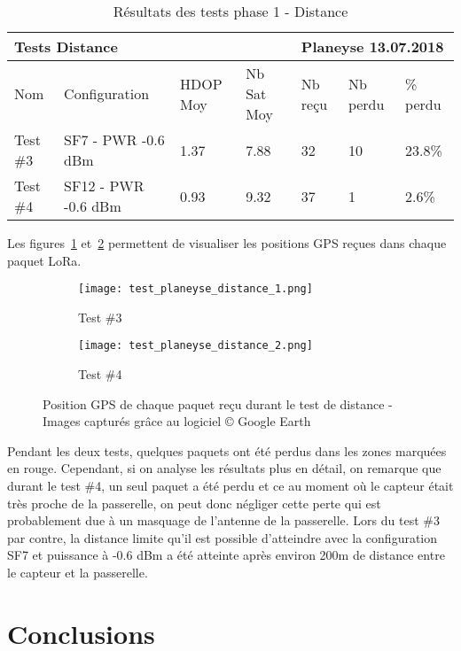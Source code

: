 \begin{table}[htb]
\caption[Résultats des tests phase 1 - Distance]{Résultats des tests phase 1 - Distance}
\label{tab:resultat_test_1_distance}
\centering
\begin{tabular}{lllllll}
\toprule
\multicolumn{4}{l}{ Tests Distance } & \multicolumn{3}{l}{ Planeyse 13.07.2018 } \\
\toprule
Nom & Configuration & HDOP Moy & Nb Sat Moy & Nb reçu & Nb perdu & \% perdu \\
\midrule
Test \#3 & SF7 - PWR -0.6 dBm & 1.37 & 7.88 & 32 & 10 & 23.8\% \\
Test \#4 & SF12 - PWR -0.6 dBm & 0.93 & 9.32 & 37 & 1 & 2.6\%  \\
\bottomrule 
\end{tabular}
\end{table}

Les figures~\ref{fig:test_distance_1} et~\ref{fig:test_distance_2} permettent de visualiser les positions GPS reçues dans chaque paquet LoRa.

\begin{figure}[htb]
\centering
\begin{subfigure}{.5\textwidth}
  \centering
  \texttt{[image: test\_planeyse\_distance\_1.png]}
  \caption{Test \#3}
  \label{fig:test_distance_1}
\end{subfigure}%
\begin{subfigure}{.5\textwidth}
  \centering
  \texttt{[image: test\_planeyse\_distance\_2.png]}
  \caption{Test \#4}
  \label{fig:test_distance_2}
\end{subfigure}
\caption[Positions GPS des tests distance]{Position GPS de chaque paquet reçu durant le test de distance - Images capturés grâce au logiciel © Google Earth}
\label{fig:test_distance}
\end{figure}

Pendant les deux tests, quelques paquets ont été perdus dans les zones marquées en rouge. Cependant, si on analyse les résultats plus en détail, on remarque que durant le test \#4, un seul paquet a été perdu et ce au moment où le capteur était très proche de la passerelle, on peut donc négliger cette perte qui est probablement due à un masquage de l'antenne de la passerelle. 
Lors du test \#3 par contre, la distance limite qu'il est possible d'atteindre avec la configuration SF7 et puissance à -0.6 dBm a été atteinte après environ 200m de distance entre le capteur et la passerelle.

\section{Conclusions}

